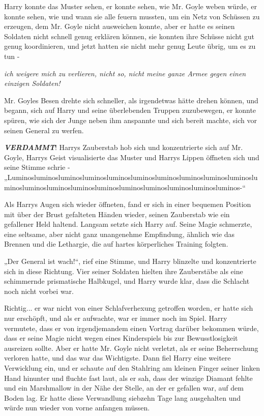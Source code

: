{Harry konnte das Muster sehen, er konnte sehen, wie Mr. Goyle weben würde, er konnte sehen, wie und wann sie alle feuern mussten, um ein Netz von Schüssen zu erzeugen, dem Mr. Goyle nicht ausweichen konnte, aber er hatte es seinen Soldaten nicht schnell genug erklären können, sie konnten ihre Schüsse nicht gut genug koordinieren, und jetzt hatten sie nicht mehr genug Leute übrig, um es zu tun -

\emph{ich weigere mich zu verlieren, nicht so, nicht meine ganze Armee gegen einen einzigen Soldaten!}

Mr. Goyles Besen drehte sich schneller, als irgendetwas hätte drehen können, und begann, sich auf Harry und seine überlebenden Truppen zuzubewegen, er konnte spüren, wie sich der Junge neben ihm anspannte und sich bereit machte, sich vor seinen General zu werfen.

\textbf{\emph{VERDAMMT}}! Harrys Zauberstab hob sich und konzentrierte sich auf Mr. Goyle, Harrys Geist visualisierte das Muster und Harrys Lippen öffneten sich und seine Stimme schrie - „Luminosluminosluminosluminosluminosluminosluminosluminosluminosluminosluminosluminosluminosluminosluminosluminosluminosluminosluminosluminos-“

Als Harrys Augen sich wieder öffneten, fand er sich in einer bequemen Position mit über der Brust gefalteten Händen wieder, seinen Zauberstab wie ein gefallener Held haltend. Langsam setzte sich Harry auf. Seine Magie schmerzte, eine seltsame, aber nicht ganz unangenehme Empfindung, ähnlich wie das Brennen und die Lethargie, die auf hartes körperliches Training folgten.

„Der General ist wach!“, rief eine Stimme, und Harry blinzelte und konzentrierte sich in diese Richtung. Vier seiner Soldaten hielten ihre Zauberstäbe als eine schimmernde prismatische Halbkugel, und Harry wurde klar, dass die Schlacht noch nicht vorbei war.

Richtig... er war nicht von einer Schlafverhexung getroffen worden, er hatte sich nur erschöpft, und als er aufwachte, war er immer noch im Spiel. Harry vermutete, dass er von irgendjemandem einen Vortrag darüber bekommen würde, dass er seine Magie nicht wegen eines Kinderspiels bis zur Bewusstlosigkeit ausreizen sollte. Aber er hatte Mr. Goyle nicht verletzt, als er seine Beherrschung verloren hatte, und das war das Wichtigste. Dann fiel Harry eine weitere Verwicklung ein, und er schaute auf den Stahlring am kleinen Finger seiner linken Hand hinunter und fluchte fast laut, als er sah, dass der winzige Diamant fehlte und ein Marshmallow in der Nähe der Stelle, an der er gefallen war, auf dem Boden lag. Er hatte diese Verwandlung siebzehn Tage lang ausgehalten und würde nun wieder von vorne anfangen müssen.

}
